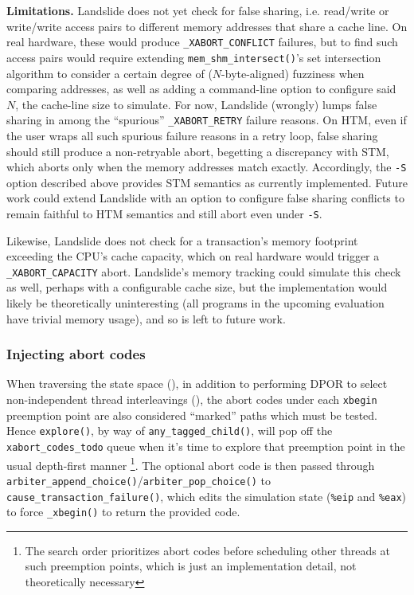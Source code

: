 {\bf Limitations.}
Landslide does not yet check for false sharing,
i.e. read/write or write/\allowbreak{}write access pairs to different memory addresses that share a cache line.
On real hardware, these would produce {\tt \_XABORT\_CONFLICT} failures,
but to find such access pairs would require extending {\tt mem\_shm\_intersect()}'s set intersection algorithm
to consider a certain degree of ($N$-byte-aligned) fuzziness when comparing addresses,
as well as adding a command-line option to configure said $N$, the cache-line size to simulate.
For now, Landslide (wrongly) lumps false sharing in among the ``spurious'' {\tt \_XABORT\_RETRY} failure reasons.
%
On HTM, even if the user wraps all such spurious failure reasons in a retry loop,
false sharing should still produce a non-retryable abort,
begetting a discrepancy with STM,
which aborts only when the memory addresses match exactly.
Accordingly, the {\tt -S} option described above provides STM semantics as currently implemented.
Future work could extend Landslide with an option to configure false sharing conflicts
to remain faithful to HTM semantics and still abort even under {\tt -S}.

Likewise, Landslide does not check for a transaction's memory footprint exceeding the CPU's cache capacity,
which on real hardware would trigger a {\tt \_XABORT\_CAPACITY} abort.
Landslide's memory tracking could simulate this check as well,
perhaps with a configurable cache size,
but the implementation would likely be theoretically uninteresting
(all programs in the upcoming evaluation have trivial memory usage),
and so is left to future work.

\subsubsection{Injecting abort codes}
When traversing the state space (\sect{\ref{sec:landslide-statespace}}),
in addition to performing DPOR to select non-independent thread interleavings (\sect{\ref{sec:landslide-dpor}}),
the abort codes under each {\tt xbegin} preemption point are also considered ``marked'' paths which must be tested.
Hence {\tt explore()}, by way of {\tt any\_tagged\_child()},
will pop off the {\tt xabort\_codes\_todo} queue
when it's time to explore that preemption point in the usual depth-first manner%
\footnote{The search order prioritizes abort codes before scheduling other threads
at such preemption points,
which is just an implementation detail, not theoretically necessary}.
The optional abort code is then passed through {\tt arbiter\_append\_choice()}/{\tt arbiter\_pop\_choice()}
to {\tt cause\_transaction\_failure()},
which edits the simulation state ({\tt \%eip} and {\tt \%eax})
to force {\tt \_xbegin()} to return the provided code.

